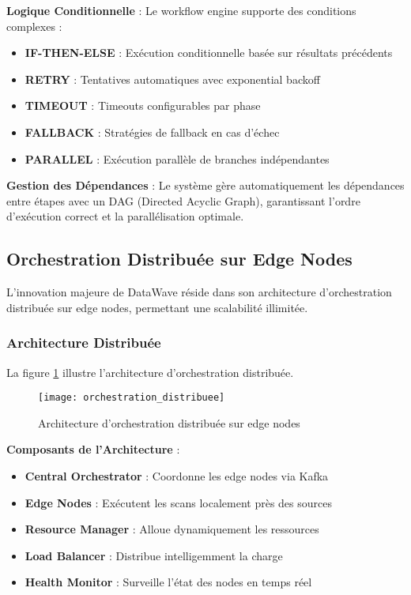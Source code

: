 \textbf{Logique Conditionnelle} : Le workflow engine supporte des conditions complexes :
\begin{itemize}
    \item \textbf{IF-THEN-ELSE} : Exécution conditionnelle basée sur résultats précédents
    \item \textbf{RETRY} : Tentatives automatiques avec exponential backoff
    \item \textbf{TIMEOUT} : Timeouts configurables par phase
    \item \textbf{FALLBACK} : Stratégies de fallback en cas d'échec
    \item \textbf{PARALLEL} : Exécution parallèle de branches indépendantes
\end{itemize}

\textbf{Gestion des Dépendances} : Le système gère automatiquement les dépendances entre étapes avec un DAG (Directed Acyclic Graph), garantissant l'ordre d'exécution correct et la parallélisation optimale.

\subsection{Orchestration Distribuée sur Edge Nodes}

L'innovation majeure de DataWave réside dans son architecture d'orchestration distribuée sur edge nodes, permettant une scalabilité illimitée.

\subsubsection{Architecture Distribuée}

La figure \ref{fig:orchestration_distribuee} illustre l'architecture d'orchestration distribuée.

\begin{figure}[htpb]
\centering
\texttt{[image: orchestration\_distribuee]}
\caption{Architecture d'orchestration distribuée sur edge nodes}
\label{fig:orchestration_distribuee}
\end{figure}

\textbf{Composants de l'Architecture} :
\begin{itemize}
    \item \textbf{Central Orchestrator} : Coordonne les edge nodes via Kafka
    \item \textbf{Edge Nodes} : Exécutent les scans localement près des sources
    \item \textbf{Resource Manager} : Alloue dynamiquement les ressources
    \item \textbf{Load Balancer} : Distribue intelligemment la charge
    \item \textbf{Health Monitor} : Surveille l'état des nodes en temps réel
\end{itemize}

